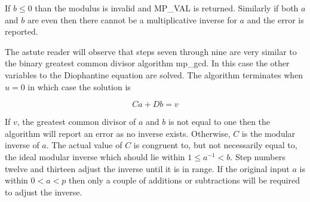 \documentclass[b5paper]{book}
\begin{document}
If $b \le 0$ than the modulus is invalid and MP\_VAL is returned.  Similarly if both $a$ and $b$ are even then there cannot be a multiplicative
inverse for $a$ and the error is reported.  

The astute reader will observe that steps seven through nine are very similar to the binary greatest common divisor algorithm mp\_gcd.  In this case
the other variables to the Diophantine equation are solved.  The algorithm terminates when $u = 0$ in which case the solution is

\begin{equation}
Ca + Db = v
\end{equation}

If $v$, the greatest common divisor of $a$ and $b$ is not equal to one then the algorithm will report an error as no inverse exists.  Otherwise, $C$
is the modular inverse of $a$.  The actual value of $C$ is congruent to, but not necessarily equal to, the ideal modular inverse which should lie 
within $1 \le a^{-1} < b$.  Step numbers twelve and thirteen adjust the inverse until it is in range.  If the original input $a$ is within $0 < a < p$ 
then only a couple of additions or subtractions will be required to adjust the inverse.
\end{document}
